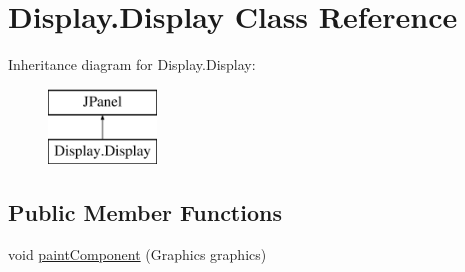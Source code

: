 \hypertarget{class_display_1_1_display}{}\section{Display.\+Display Class Reference}
\label{class_display_1_1_display}
Inheritance diagram for Display.\+Display\+:\begin{figure}[H]
\begin{center}
\leavevmode
\includegraphics[height=2.000000cm]{class_display_1_1_display}
\end{center}
\end{figure}
\subsection*{Public Member Functions}
\begin{DoxyCompactItemize}
\item 
void \hyperlink{class_display_1_1_display_af117c5499fbaada7683424523b9f333f}{paint\+Component} (Graphics graphics)
\end{DoxyCompactItemize}
